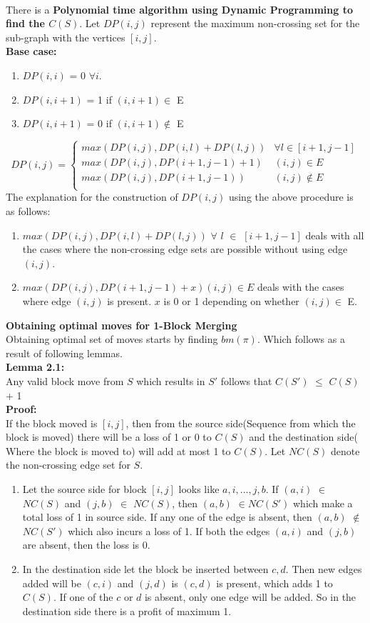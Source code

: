 \documentclass[BTech]{iitmdiss}
\begin{document}
\\
\noindent
There is a \textbf{Polynomial time algorithm using Dynamic Programming to find the $C(S)$}. Let $DP(i,j)$ represent the maximum non-crossing set for the sub-graph with the vertices $[i,j]$. \\
\textbf{Base case:}
\begin{enumerate}
    \item $DP(i,i)$ = 0 $\forall i$.
    \item $DP(i,i+1)$ = 1 if $(i,i+1) \in$ E
    \item $DP(i,i+1)$ = 0 if $(i,i+1) \notin$ E
\end{enumerate}
\[ DP(i,j) = \begin{cases} 
      max(DP(i,j),DP(i,l) + DP(l,j)) & \forall l \in [i+1,j-1] \\
      max(DP(i,j),DP(i+1,j-1) + 1) & (i,j) \in E \\
      max(DP(i,j),DP(i+1,j-1)) & (i,j) \notin E \\
   \end{cases}
\]
The explanation for the construction of $DP(i,j)$ using the above procedure is as follows:
\begin{enumerate}
    \item $max(DP(i,j),DP(i,l) + DP(l,j))$  $\forall$ $l$ $\in$ $[i+1,j-1]$ deals with all the cases where the non-crossing edge sets are possible without using edge $(i,j)$.
    \item $max(DP(i,j),DP(i+1,j-1) + x) (i,j) \in E$ deals with the cases where edge $(i,j)$ is present. $x$ is 0 or 1 depending on whether $(i,j) \in$ E. 
\end{enumerate}
\noindent
\textbf{Obtaining optimal moves for 1-Block Merging}\\
Obtaining optimal set of moves starts by finding $bm(\pi)$. Which follows as a result of following lemmas.\\
\textbf{Lemma 2.1:}\\
Any valid block move from $S$ which results in $S'$ follows that $C(S')$ $\leq$ $C(S)$ + 1\\
\textbf{Proof:}\\
If the block moved is $[i,j]$, then from the source side(Sequence from which the block is moved) there will be a loss of 1 or 0 to $C(S)$ and the destination side( Where the block is moved to) will add at most 1 to $C(S)$. Let $NC(S)$ denote the non-crossing edge set for $S$.
\begin{enumerate}
    \item Let the source side for block $[i,j]$ looks like $a,i,...,j,b.$ If $(a,i)$ $\in$ $NC(S)$ and $(j,b)$ $\in$ $NC(S)$, then $(a,b)$ $\in NC(S')$ which make a total loss of 1 in source side. If any one of the edge is absent, then $(a,b)$ $\notin$ $NC(S')$ which also incurs a loss of 1. If both the edges $(a,i)$ and $(j,b)$ are absent, then the loss is 0.
    \item In the destination side let the block be inserted between $c,d$. Then new edges added will be $(c,i)$ and $(j,d)$ is $(c,d)$ is present, which adds 1 to $C(S)$. If one of the $c$ or $d$ is absent, only one edge will be added. So in the destination side there is a profit of maximum 1.
\end{enumerate}
\end{document}
